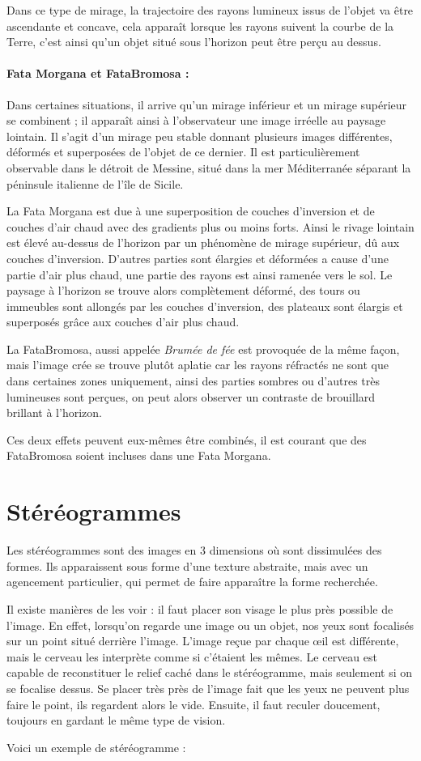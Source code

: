 \documentclass[a4paper, 12pt, onecolumn, openany]{report}
\begin{document}
	Dans ce type de mirage, la trajectoire des rayons lumineux issus de l’objet va être ascendante et concave, cela apparaît lorsque les rayons suivent la courbe de la Terre, c’est ainsi qu’un objet situé sous l’horizon peut être perçu au dessus. 

\paragraph{Fata Morgana et FataBromosa :}
	Dans certaines situations, il arrive qu’un mirage inférieur et un mirage supérieur se combinent ; il apparaît ainsi à l’observateur une image irréelle au paysage lointain. 
	Il s’agit d’un mirage peu stable donnant plusieurs images différentes, déformés et superposées de l’objet de ce dernier. 
	Il est particulièrement observable dans le détroit de Messine, situé dans la mer Méditerranée séparant la péninsule italienne de l’île de Sicile. 
	
	La Fata Morgana est due à une superposition de couches d’inversion et de couches d’air chaud avec des gradients plus ou moins forts. Ainsi le rivage lointain est élevé au-dessus de l’horizon par un phénomène de mirage supérieur, dû aux couches d’inversion. D’autres parties sont élargies et déformées a cause d’une partie d’air plus chaud, une partie des rayons est ainsi ramenée vers le sol.  Le paysage à l’horizon se trouve alors complètement déformé, des tours ou immeubles sont allongés par les couches d’inversion, des plateaux sont élargis et superposés grâce aux couches d’air plus chaud. 
	
	La FataBromosa, aussi appelée \textit{Brumée de fée} est provoquée de la même façon, mais l’image crée se trouve plutôt aplatie car les rayons réfractés ne sont que dans certaines zones uniquement, ainsi des parties sombres ou d’autres très lumineuses sont perçues,  on peut alors observer un contraste de brouillard brillant à l’horizon. 

Ces deux effets peuvent eux-mêmes être combinés, il est courant que des FataBromosa soient incluses dans une Fata Morgana. 

	\section{Stéréogrammes}
	Les stéréogrammes sont des images en 3 dimensions où sont dissimulées des formes. Ils apparaissent sous forme d’une texture abstraite, mais avec un agencement particulier, qui permet de faire apparaître la forme recherchée.
	
	Il existe manières de les voir : il faut placer son visage le plus près possible de l’image. En effet, lorsqu’on regarde une image ou un objet, nos yeux sont focalisés sur un point situé derrière l’image. L’image reçue par chaque œil est différente, mais le cerveau les interprète comme si c’étaient les mêmes. Le cerveau est capable de reconstituer le relief caché dans le stéréogramme, mais seulement si on se focalise dessus. Se placer très près de l’image fait que les yeux ne peuvent plus faire le point, ils regardent alors le vide. Ensuite, il faut reculer doucement, toujours en gardant le même type de vision. 
	
	Voici un exemple de stéréogramme :
\end{document}
